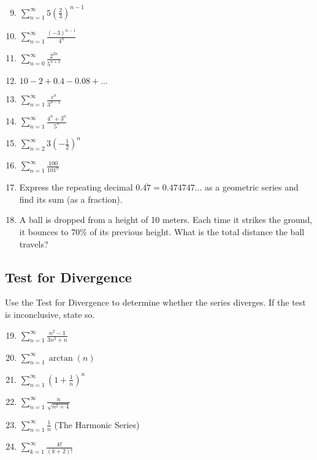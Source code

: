 \documentclass[12pt]{article}
\begin{document}
\begin{enumerate}
    \setcounter{enumi}{8}
    \item $\sum_{n=1}^\infty 5 \left(\frac{2}{3}\right)^{n-1}$
    
    \item $\sum_{n=1}^\infty \frac{(-3)^{n-1}}{4^n}$
    
    \item $\sum_{n=0}^\infty \frac{2^{2n}}{5^{n+1}}$

    \item $10 - 2 + 0.4 - 0.08 + \dots$

    \item $\sum_{n=1}^\infty \frac{e^n}{3^{n-1}}$

    \item $\sum_{n=1}^\infty \frac{4^n + 3^n}{5^n}$
    
    \item $\sum_{n=2}^\infty 3 \left(-\frac{1}{2}\right)^n$
    
    \item $\sum_{n=1}^\infty \frac{100}{101^n}$
    
    \item Express the repeating decimal $0.\overline{47} = 0.474747\dots$ as a geometric series and find its sum (as a fraction).
    
    \item A ball is dropped from a height of 10 meters. Each time it strikes the ground, it bounces to 70\% of its previous height. What is the total distance the ball travels?

\end{enumerate}

\subsection{Test for Divergence}
Use the Test for Divergence to determine whether the series diverges. If the test is inconclusive, state so.

\begin{enumerate}
    \setcounter{enumi}{18}
    \item $\sum_{n=1}^\infty \frac{n^2 - 1}{3n^2 + n}$

    \item $\sum_{n=1}^\infty \arctan(n)$

    \item $\sum_{n=1}^\infty \left(1 + \frac{1}{n}\right)^n$
    
    \item $\sum_{n=1}^\infty \frac{n}{\sqrt{n^2+4}}$
    
    \item $\sum_{n=1}^\infty \frac{1}{n}$ (The Harmonic Series)
    
    \item $\sum_{k=1}^\infty \frac{k!}{(k+2)!}$

\end{enumerate}
\end{document}
